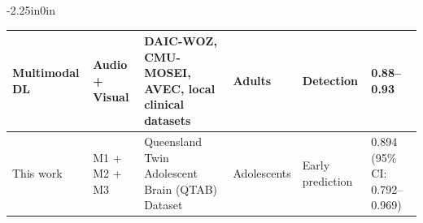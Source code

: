\documentclass[10pt,letterpaper]{article}
\begin{document}
\begin{table}[!t]
\begin{adjustwidth}{-2.25in}{0in}
\begin{tabular}{|p{3.0cm}|p{2.4cm}|p{3.6cm}|p{2.0cm}|p{2.0cm}|p{2.4cm}|}
                                                                                                                          Multimodal DL~\cite{ref5,ref7,ref8,ref10}
                                                                                                                          & Audio + Visual
                                                                                                                          & DAIC-WOZ, CMU-MOSEI, AVEC, local clinical datasets
                                                                                                                          & Adults
                                                                                                                          & Detection
                                                                                                                          & 0.88--0.93 \\
                                                                                                                          \hline

                                                                                                                          This work
                                                                                                                          & M1 + M2 + M3
                                                                                                                          & Queensland Twin Adolescent Brain (QTAB) Dataset~\cite{ref31}
                                                                                                                          & Adolescents
                                                                                                                          & Early prediction
                                                                                                                          & 0.894 (95\% CI: 0.792--0.969) \\
                                                                                                                          \hline

                                                                                                                          \end{tabular}


\end{adjustwidth}
\end{table}
\end{document}
